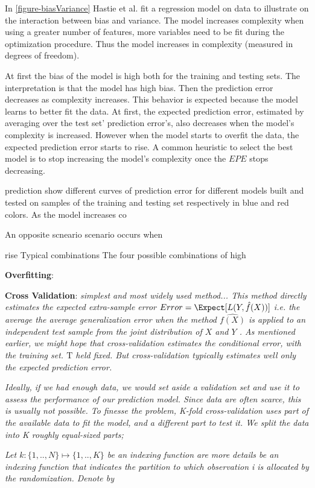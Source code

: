 In \ref{figure-biasVariance} Hastie et al. fit a regression model on data to illustrate on the interaction between bias and variance. The model increases complexity when using a greater number of features, more variables need to be fit during the optimization procedure. Thus the model increases in complexity (measured in degrees of freedom). 

At first the bias of the model is high both for the training and testing sets. The interpretation is that the model has high bias. Then the prediction error decreases as complexity increases. This behavior is expected because the model learns to better fit the data. At first, the expected prediction error, estimated by averaging over the test set' prediction error's, also decreases when the model's complexity is increased. However when the model starts to overfit the data, the expected prediction error starts to rise. A common heuristic to select the best model is to stop increasing the model's complexity once the $EPE$ stops decreasing.


prediction 
show different curves of prediction error for different models built and tested on samples of the training and testing set respectively in blue and red colors. As the model increases co

An opposite scneario scenario occurs when

rise Typical combinations
The four possible combinations of high 


\textbf{Overfitting}: 
 

\textbf{Cross Validation}:  
\textit{simplest and most widely used method... This method directly estimates the expected extra-sample error
$Error = \Expect[L(Y,\hat{f}(X))] $ i.e. the average the average generalization error when the method $\hat{f(X)}$ is applied to an independent test sample from the joint distribution of $X$ and $Y$ . As mentioned earlier, we might hope that cross-validation estimates the conditional error, with the training set. $\mathrm{T}$ held fixed. But cross-validation typically estimates well only the expected prediction error.}

\textit{Ideally, if we had enough data, we would set aside a validation set and use it to assess the performance of our prediction model. Since data are often scarce, this is usually not possible. To finesse the problem, K-fold cross-validation uses part of the available data to fit the model, and a different part to test it. We split the data into K roughly equal-sized parts; }

\textit{Let $k : \{1,..,N\} \mapsto \{1, .., K\}$ be an indexing function are more details be an indexing
function that indicates the partition to which observation i is allocated by the randomization. Denote by}


